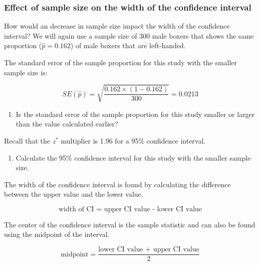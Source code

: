 \documentclass[
]{report}
\providecommand{\tightlist}{%
  \setlength{\itemsep}{0pt}\setlength{\parskip}{0pt}}
\begin{document}
\vspace{0.5in}

\subsubsection*{Effect of sample size on the width of the confidence interval}\label{effect-of-sample-size-on-the-width-of-the-confidence-interval}

How would an decrease in sample size impact the width of the confidence interval? We will again use a sample size of 300 male boxers that shows the same proportion (\(\hat{p}=0.162\)) of male boxers that are left-handed.

The standard error of the sample proportion for this study with the smaller sample size is:

\[SE(\hat{p}) = \sqrt{\frac{0.162\times (1-0.162)}{300}} = 0.0213\]

\begin{enumerate}
\def\labelenumi{\arabic{enumi}.}
\setcounter{enumi}{8}
\tightlist
\item
  Is the standard error of the sample proportion for this study smaller or larger than the value calculated earlier?
\end{enumerate}

\vspace{0.3in}

Recall that the \(z^*\) multiplier is 1.96 for a 95\% confidence interval.

\begin{enumerate}
\def\labelenumi{\arabic{enumi}.}
\setcounter{enumi}{9}
\tightlist
\item
  Calculate the 95\% confidence interval for this study with the smaller sample size.
\end{enumerate}

\vspace{1in}

The width of the confidence interval is found by calculating the difference between the upper value and the lower value.

\[\text{width of CI = upper CI value - lower CI value}\]

\newpage

The center of the confidence interval is the sample statistic and can also be found using the midpoint of the interval.

\[\text{midpoint} = \frac{\text{lower CI value + upper CI value}}{2}\]
\end{document}
